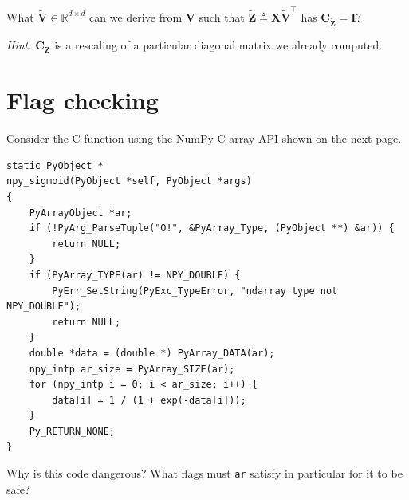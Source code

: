 \documentclass{article}
\numberwithin{equation}{section}
\begin{document}
\medskip

What $ \tilde{\mathbf{V}} \in \mathbb{R}^{d \times d} $ can we derive from
$ \mathbf{V} $ such that $ \tilde{\mathbf{Z}} \triangleq
\mathbf{X}\tilde{\mathbf{V}}^\top $ has
$ \mathbf{C}_{\tilde{\mathbf{Z}}} = \mathbf{I} $?

\medskip

\textit{Hint.} $ \mathbf{C}_\mathbf{Z} $ is a rescaling of a particular
diagonal matrix we already computed.

\section{Flag checking}

Consider the C function using the \href{
    https://numpy.org/devdocs/reference/c-api/array.html
}{NumPy C array API} shown on the next page.

\begin{verbatim}
static PyObject *
npy_sigmoid(PyObject *self, PyObject *args)
{
    PyArrayObject *ar;
    if (!PyArg_ParseTuple("O!", &PyArray_Type, (PyObject **) &ar)) {
        return NULL;
    }
    if (PyArray_TYPE(ar) != NPY_DOUBLE) {
        PyErr_SetString(PyExc_TypeError, "ndarray type not NPY_DOUBLE");
        return NULL;
    }
    double *data = (double *) PyArray_DATA(ar);
    npy_intp ar_size = PyArray_SIZE(ar);
    for (npy_intp i = 0; i < ar_size; i++) {
        data[i] = 1 / (1 + exp(-data[i]));
    }
    Py_RETURN_NONE;
}
\end{verbatim}

Why is this code dangerous? What flags must \texttt{ar} satisfy in particular
for it to be safe?
\end{document}
